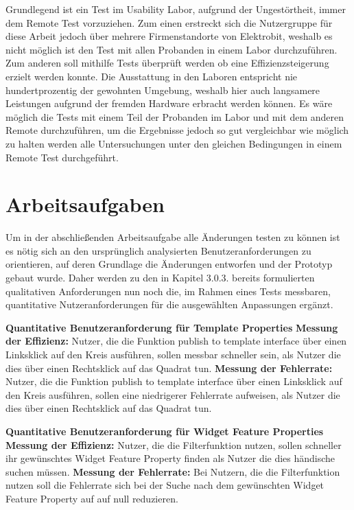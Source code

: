 Grundlegend ist ein Test im Usability Labor, aufgrund der Ungestörtheit, immer dem Remote Test vorzuziehen.
Zum einen erstreckt sich die Nutzergruppe für diese Arbeit  jedoch über mehrere Firmenstandorte von Elektrobit, weshalb es nicht möglich ist den Test mit allen Probanden in einem Labor durchzuführen.
Zum anderen soll mithilfe Tests überprüft werden ob eine Effizienzsteigerung erzielt werden konnte.
Die Ausstattung in den Laboren entspricht nie hundertprozentig der gewohnten Umgebung, weshalb hier auch langsamere Leistungen aufgrund der fremden Hardware erbracht werden können.
Es wäre möglich die Tests mit einem Teil der Probanden im Labor und mit dem anderen Remote durchzuführen, um die Ergebnisse jedoch so gut vergleichbar wie möglich zu halten werden alle Untersuchungen unter den gleichen Bedingungen in einem Remote Test durchgeführt.

\section{Arbeitsaufgaben}

Um in der abschließenden Arbeitsaufgabe alle Änderungen testen zu können ist es nötig sich an den ursprünglich analysierten Benutzeranforderungen zu orientieren, auf deren Grundlage die Änderungen entworfen und der Prototyp gebaut wurde.
Daher werden zu den in Kapitel 3.0.3. bereits formulierten qualitativen Anforderungen nun noch die, im Rahmen eines Tests messbaren, quantitative Nutzeranforderungen für die ausgewählten Anpassungen ergänzt.

\textbf{Quantitative Benutzeranforderung für Template Properties}\newline
\textbf{Messung der Effizienz:}
Nutzer, die die Funktion \glqq publish to template interface\grqq{} über einen Linksklick auf den Kreis ausführen, sollen messbar schneller sein, als Nutzer die dies über einen Rechtsklick auf das Quadrat tun. \newline
\textbf{Messung der Fehlerrate:} 
Nutzer, die die Funktion \glqq publish to template interface\grqq{} über einen Linksklick auf den Kreis ausführen, sollen eine niedrigerer Fehlerrate aufweisen, als Nutzer die dies über einen Rechtsklick auf das Quadrat tun.

\textbf{Quantitative Benutzeranforderung für Widget Feature Properties} \newline
\textbf{Messung der Effizienz:}
Nutzer, die die Filterfunktion nutzen, sollen schneller ihr gewünschtes Widget Feature Property finden als Nutzer die dies händische suchen müssen. \newline
\textbf{Messung der Fehlerrate:}
Bei Nutzern, die die Filterfunktion nutzen soll die Fehlerrate sich bei der Suche nach dem gewünschten Widget Feature Property auf auf null reduzieren.

